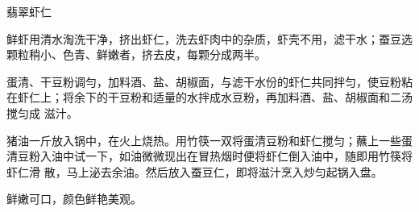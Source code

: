 \begin{recipe}{翡翠虾仁}

\ingredients


\cooking

\step 鲜虾用清水淘洗干净，挤出虾仁，洗去虾肉中的杂质，虾壳不用，滤干水；蚕豆选
颗粒稍小、色青、鲜嫩者，挤去皮，每颗分成两半。

\step 蛋清、干豆粉调勻，加料酒、盐、胡椒面，与滤干水份的虾仁共同拌匀，使豆粉粘
在虾仁上；将余下的干豆粉和适量的水拌成水豆粉，再加料酒、盐、胡椒面和二汤搅匀成
滋汁。

\step 猪油一斤放入锅中，在火上烧热。用竹筷一双将蛋清豆粉和虾仁搅匀；蘸上一些蛋
清豆粉入油中试一下，如油微微现出在冒热烟时便将虾仁倒入油中，随即用竹筷将虾仁滑
散，马上泌去余油。然后放入蚕豆仁，即将滋汁烹入炒匀起锅入盘。

\notes

鲜嫩可口，颜色鲜艳美观。

\end{recipe}

